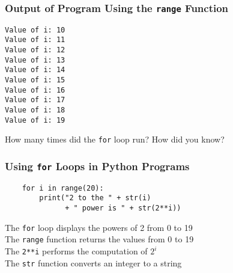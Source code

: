 \documentclass[14pt,aspectratio=169]{beamer}
\begin{document}
%
\begin{frame}[fragile]
  \frametitle{Output of Program Using the {\tt range} Function}
  \normalsize
  \begin{minipage}{6in}
    \vspace*{.25in}
    \begin{verbatim}
Value of i: 10
Value of i: 11
Value of i: 12
Value of i: 13
Value of i: 14
Value of i: 15
Value of i: 16
Value of i: 17
Value of i: 18
Value of i: 19
    \end{verbatim}
  \end{minipage}
  \vspace*{.05in}
  \begin{center}
    \normalsize \noindent How many times did the {\tt for} loop run? How did
    you know?\\
  \end{center}
\end{frame}

%
\begin{frame}[fragile]
  \frametitle{Using {\tt for} Loops in Python Programs}
  \normalsize
  \hspace*{-.65in}
  \begin{minipage}{6in}
    \vspace*{.25in}
    \begin{verbatim}
    for i in range(20):
        print("2 to the " + str(i)
              + " power is " + str(2**i))
    \end{verbatim}
  \end{minipage}
  \vspace*{.25in}
  \begin{center}
    \normalsize \noindent The {\tt for} loop displays the powers of 2 from 0 to 19 \\
    \normalsize \noindent The {\tt range} function returns the values from 0 to 19 \\
    \normalsize \noindent The {\tt 2**i} performs the computation of $2^i$ \\
    \normalsize \noindent The {\tt str} function converts an integer to a string \\
  \end{center}
\end{frame}
\end{document}
